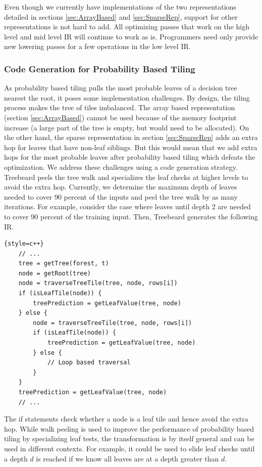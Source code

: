 Even though we currently have implementations of the two representations detailed in sections \ref{sec:ArrayBased} 
and \ref{sec:SparseRep}, support for other representations is not hard to add. All optimizing passes that work on 
the high level and mid level IR will continue to work as is. Programmers need only provide new lowering passes for
a few operations in the low level IR.

\subsubsection{Code Generation for Probability Based Tiling}
As probability based tiling pulls the most probable leaves of a decision tree nearest the root, it poses 
some implementation challenges. By design, the tiling process makes the tree of tiles 
imbalanced. The array based representation (section \ref{sec:ArrayBased})
cannot be used because of the memory footprint increase (a large part of the tree is empty, but would need to be allocated).
On the other hand, the sparse representation in section \ref{sec:SparseRep} adds 
an extra hop for leaves that have non-leaf siblings. But this would mean that we add extra hops for 
the most probable leaves after probability based tiling which defeats the optimization.
We address these challenges using a code generation strategy. Treebeard peels 
the tree walk and specializes the leaf checks at higher levels to avoid the extra hop. Currently, 
we determine the maximum depth of leaves needed to cover 90 percent of the inputs and peel the tree 
walk by as many iterations. For example, consider the case where leaves until depth 2 are needed to 
cover 90 percent of the training input. Then, Treebeard generates the following IR. 

\begin{lstlisting}{style=c++}
    // ...
    tree = getTree(forest, t)
    node = getRoot(tree)
    node = traverseTreeTile(tree, node, rows[i])
    if (isLeafTile(node)) {
        treePrediction = getLeafValue(tree, node)
    } else {    
        node = traverseTreeTile(tree, node, rows[i])
        if (isLeafTile(node)) {
            treePrediction = getLeafValue(tree, node)
        } else {    
            // Loop based traversal 
        }
    }
    treePrediction = getLeafValue(tree, node)
    // ...
\end{lstlisting}

The if statements check whether a node is a leaf tile and hence avoid the extra hop. 
While walk peeling is used to improve the performance of probability based tiling by specializing leaf tests,
the transformation is by itself general and can be used in different contexts. For example, it could be used 
to elide leaf checks until a depth $d$ is reached if we know all leaves are at a depth greater than $d$. 


